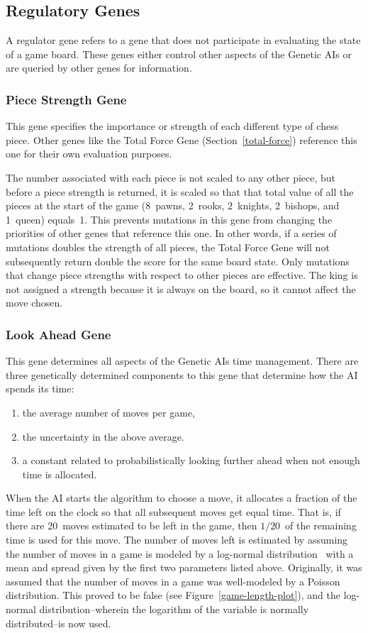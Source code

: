 \documentclass[letterpaper]{article}
\renewcommand\_{\textunderscore\allowbreak}
\begin{document}
\subsection{Regulatory Genes}
A regulator gene refers to a gene that does not participate in evaluating the state of a game board. These genes either control other aspects of the Genetic AIs or are queried by other genes for information.

\subsubsection{Piece Strength Gene}
This gene specifies the importance or strength of each different type of chess piece. Other genes like the Total Force Gene (Section~\ref{total-force}) reference this one for their own evaluation purposes.

The number associated with each piece is not scaled to any other piece, but before a piece strength is returned, it is scaled so that that total value of all the pieces at the start of the game (8~pawns, 2~rooks, 2~knights, 2~bishops, and 1~queen) equals~1. This prevents mutations in this gene from changing the priorities of other genes that reference this one. In other words, if a series of mutations doubles the strength of all pieces, the Total Force Gene will not subsequently return double the score for the same board state. Only mutations that change piece strengths with respect to other pieces are effective. The king is not assigned a strength because it is always on the board, so it cannot affect the move chosen.

\subsubsection{Look Ahead Gene}
This gene determines all aspects of the Genetic AIs time management. There are three genetically determined components to this gene that determine how the AI spends its time:
\begin{enumerate}
	\item the average number of moves per game,
	\item the uncertainty in the above average.
	\item a constant related to probabilistically looking further ahead when not enough time is allocated.
\end{enumerate}
When the AI starts the algorithm to choose a move, it allocates a fraction of the time left on the clock so that all subsequent moves get equal time. That is, if there are 20~moves estimated to be left in the game, then \(1/20\)~of the remaining time is used for this move. The number of moves left is estimated by assuming the number of moves in a game is modeled by a log-normal distribution~\cite{log-norm-wiki}\cite{log-norm-chess-se} with a mean and spread given by the first two parameters listed above. Originally, it was assumed that the number of moves in a game was well-modeled by a Poisson distribution. This proved to be false (see Figure~\ref{game-length-plot}), and the log-normal distribution--wherein the logarithm of the variable is normally distributed--is now used.
\end{document}

